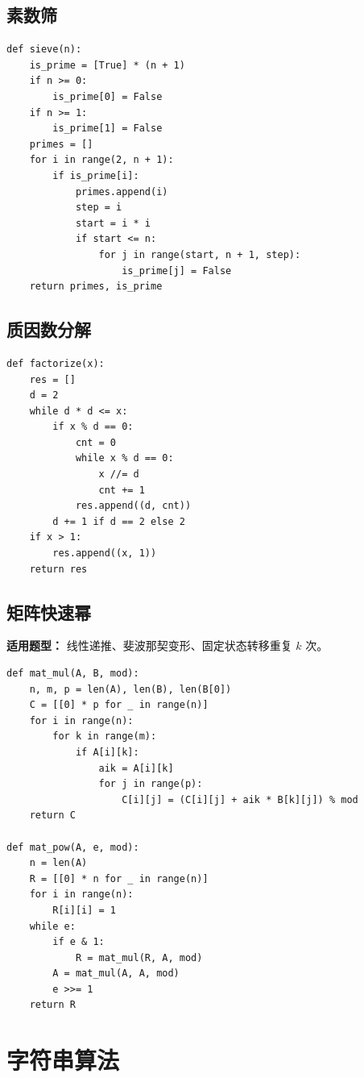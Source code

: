 \documentclass[UTF8,a4paper,14pt]{ctexart}
\begin{document}
\subsection{素数筛}

\begin{lstlisting}
def sieve(n):
    is_prime = [True] * (n + 1)
    if n >= 0:
        is_prime[0] = False
    if n >= 1:
        is_prime[1] = False
    primes = []
    for i in range(2, n + 1):
        if is_prime[i]:
            primes.append(i)
            step = i
            start = i * i
            if start <= n:
                for j in range(start, n + 1, step):
                    is_prime[j] = False
    return primes, is_prime
\end{lstlisting}

\subsection{质因数分解}

\begin{lstlisting}
def factorize(x):
    res = []
    d = 2
    while d * d <= x:
        if x % d == 0:
            cnt = 0
            while x % d == 0:
                x //= d
                cnt += 1
            res.append((d, cnt))
        d += 1 if d == 2 else 2
    if x > 1:
        res.append((x, 1))
    return res
\end{lstlisting}

\subsection{矩阵快速幂}

\textbf{适用题型：}
线性递推、斐波那契变形、固定状态转移重复 $k$ 次。

\begin{lstlisting}
def mat_mul(A, B, mod):
    n, m, p = len(A), len(B), len(B[0])
    C = [[0] * p for _ in range(n)]
    for i in range(n):
        for k in range(m):
            if A[i][k]:
                aik = A[i][k]
                for j in range(p):
                    C[i][j] = (C[i][j] + aik * B[k][j]) % mod
    return C

def mat_pow(A, e, mod):
    n = len(A)
    R = [[0] * n for _ in range(n)]
    for i in range(n):
        R[i][i] = 1
    while e:
        if e & 1:
            R = mat_mul(R, A, mod)
        A = mat_mul(A, A, mod)
        e >>= 1
    return R
\end{lstlisting}

\section{字符串算法}
\end{document}

